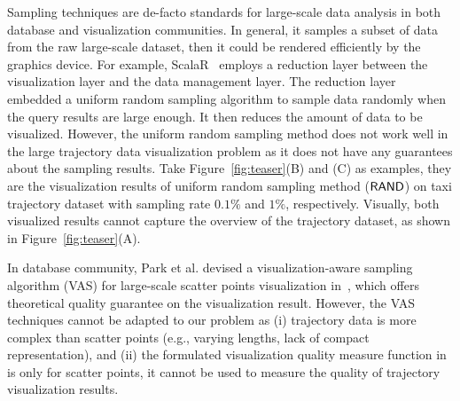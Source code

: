 {Sampling techniques are de-facto standards} for large-scale data analysis in both database and visualization communities.
In general, it samples a subset of data from the raw large-scale dataset, then it could be rendered efficiently by the graphics device.
For example, ScalaR~\cite{battle2013dynamic} employs a reduction layer between the visualization layer and the data management layer.
The reduction layer embedded a uniform random sampling algorithm to sample data randomly when the query results are large enough.
It then reduces the amount of data to be visualized.
However, the uniform random sampling method does not work well in the large trajectory data visualization problem as it does not have any guarantees about the sampling results.
Take Figure~\ref{fig:teaser}(B) and (C) as examples,
they are the visualization results of uniform random sampling method ($\mathsf{RAND}$) on \pt{} taxi trajectory dataset with sampling rate $0.1\%$ and $1\%$, respectively.
Visually, both visualized results cannot capture the overview of the \pt{} trajectory dataset, as shown in Figure~\ref{fig:teaser}(A).

In database community,  Park et al. devised a visualization-aware sampling algorithm (VAS) for large-scale scatter points visualization  in~\cite{park2016visualization},
which offers theoretical quality guarantee on the visualization result.
However, the VAS techniques cannot be adapted to our problem as  (i) trajectory data is  more complex than scatter points (e.g., varying lengths, lack of compact representation),
and  (ii) the formulated visualization quality measure function in~\cite{park2016visualization} is only for scatter points, it cannot be used to measure the quality of trajectory visualization results.

